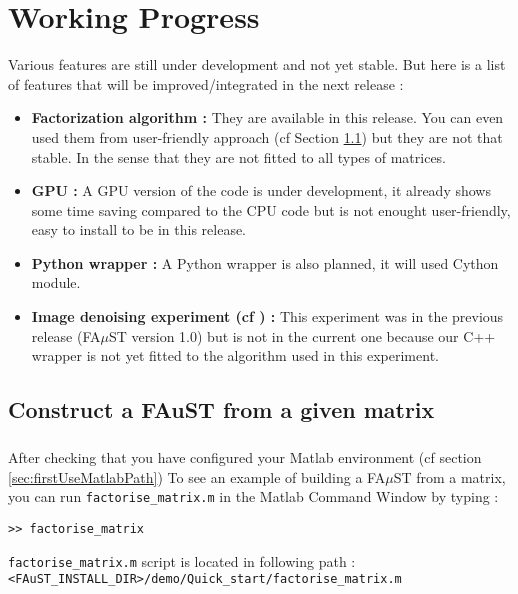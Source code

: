 \chapter{Working Progress}\label{sec:WorkingProgress}
Various features are still under development and not yet stable.
But here is a list of features that will be improved/integrated in the next release :
\begin{itemize}
	\item \textbf{Factorization algorithm : } They are available in this release. You can even used them
from user-friendly approach (cf Section \ref{sec:WorkingProgressBuildFromMatrix}) but they are not
that stable. In the sense that they are not fitted to all types of matrices.
	\item \textbf{GPU : } A GPU version of the code is under development, it already shows 
some time saving compared to the CPU code but is not enought user-friendly, easy to install to be in this release.
	\item \textbf{Python wrapper : } A Python wrapper is also planned, it will used Cython module.
	\item \textbf{Image denoising experiment (cf \cite[chapter VI.]{LeMagoarou2016}) :} This experiment was in the previous release (FA$\mu$ST version 1.0) 
	but is not in the current one because our C++ wrapper is not yet fitted to the algorithm used in this experiment.    
\end{itemize}

\section{Construct a FAuST from a given matrix}\label{sec:WorkingProgressBuildFromMatrix}
\paragraph{}
	After checking that you have configured your Matlab environment (cf section \ref{sec:firstUseMatlabPath})  
	To see an example of building a FA$\mu$ST from a matrix, you can run \texttt{factorise\_matrix.m} in the Matlab Command Window by typing :
\lstset{style=customMatlab}
\begin{lstlisting}
>> factorise_matrix
\end{lstlisting}
\texttt{factorise\_matrix.m} script is located in following path :\\
\texttt{<FAuST\_INSTALL\_DIR>/demo/Quick\_start/factorise\_matrix.m} \\

